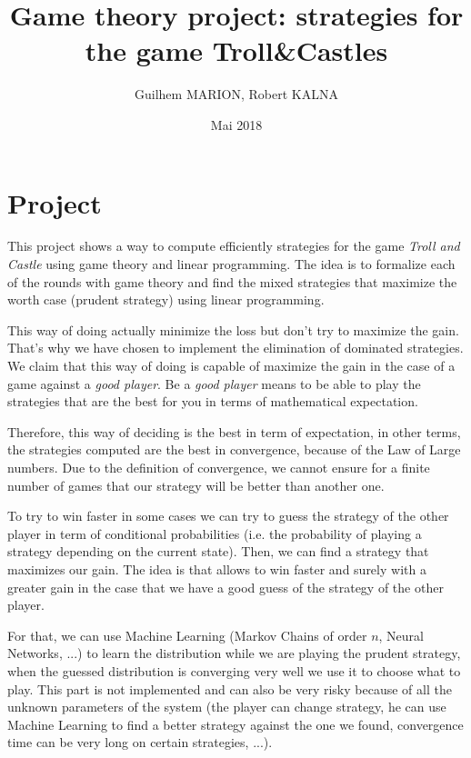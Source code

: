 \documentclass{article}%
\begin{document}
%
\author{Guilhem MARION, Robert KALNA}
\title{Game theory project: strategies for the game Troll\&Castles}
\date{Mai 2018}
\maketitle
\normalsize%
\section{Project}

This project shows a way to compute efficiently strategies for the game \textit{Troll and Castle} using game theory and linear programming. The idea is to formalize each of the rounds with game theory and find the mixed strategies that maximize the worth case (prudent strategy) using linear programming. 

This way of doing actually minimize the loss but don't try to maximize the gain. That's why we have chosen to implement the elimination of dominated strategies. We claim that this way of doing is capable of maximize the gain in the case of a game against a \textit{good player}. Be a \textit{good player} means to be able to play the strategies that are the best for you in terms of mathematical expectation. 

Therefore, this way of deciding is the best in term of expectation, in other terms, the strategies computed are the best in convergence, because of the Law of Large numbers. Due to the definition of convergence, we cannot ensure for a finite number of games that our strategy will be better than another one.

To try to win faster in some cases we can try to guess the strategy of the other player in term of conditional probabilities (i.e. the probability of playing a strategy depending on the current state). Then, we can find a strategy that maximizes our gain. The idea is that allows to win faster and surely with a greater gain in the case that we have a good guess of the strategy of the other player.

For that, we can use Machine Learning (Markov Chains of order $n$, Neural Networks, ...) to learn the distribution while we are playing the prudent strategy, when the guessed distribution is converging very well we use it to choose what to play. This part is not implemented and can also be very risky because of all the unknown parameters of the system (the player can change strategy, he can use Machine Learning to find a better strategy against the one we found, convergence time can be very long on certain strategies, ...). 
\end{document}
